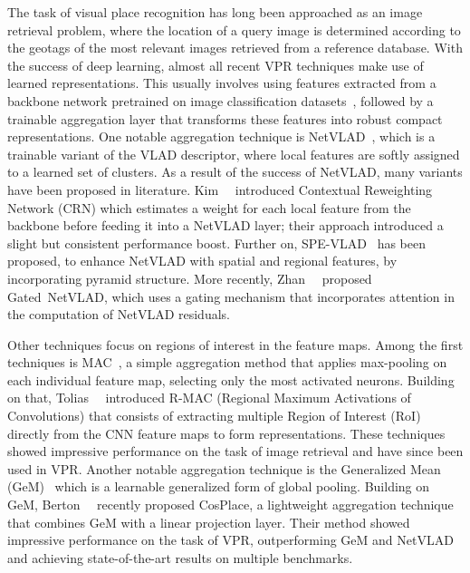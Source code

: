 \documentclass[10pt,twocolumn,letterpaper]{article}
\begin{document}
The task of visual place recognition has long been approached as an image retrieval problem, where the location of a query image is determined according to the geotags of the most relevant images retrieved from a reference database. With the success of deep learning, almost all recent VPR techniques make use of learned representations. This usually involves using features extracted from a backbone network pretrained on image classification datasets~\cite{krizhevsky2012imagenet}, followed by a trainable aggregation layer that transforms these features into robust compact representations. One notable aggregation technique is NetVLAD~\cite{arandjelovic2016netvlad}, which is a trainable variant of the VLAD descriptor, where local features are softly assigned to a learned set of clusters. As a result of the success of NetVLAD, many variants have been proposed in literature. Kim~\etal~\cite{kim2017learned} introduced Contextual Reweighting Network (CRN) which estimates a weight for each local feature from the backbone before feeding it into a NetVLAD layer; their approach introduced a slight  but consistent performance boost. Further on, SPE-VLAD~\cite{yu2019spatial} has been proposed, to enhance NetVLAD with spatial and regional features, by incorporating pyramid structure. More recently, Zhan~\etal~\cite{zhang2021vector} proposed Gated~NetVLAD, which uses a gating mechanism that incorporates attention in the computation of NetVLAD residuals.

Other techniques focus on regions of interest in the feature maps. Among the first techniques is MAC~\cite{babenko2015aggregating}, a simple aggregation method that applies max-pooling on each individual feature map, selecting only the most activated neurons. Building on that, Tolias~\etal~\cite{tolias2015particular} introduced R-MAC (Regional Maximum Activations of Convolutions) that consists of extracting multiple Region of Interest (RoI) directly from the CNN feature maps to form representations. These techniques showed impressive performance on the task of image retrieval and have since been used in VPR. Another notable aggregation technique is the Generalized Mean (GeM)~\cite{radenovic2018fine} which is a learnable generalized form of global pooling. Building on GeM, Berton~\etal~\cite{berton2022rethinking} recently proposed CosPlace, a lightweight aggregation technique that combines GeM with a linear projection layer. Their method showed impressive performance on the task of VPR, outperforming GeM and NetVLAD and achieving state-of-the-art results on multiple benchmarks.
\end{document}
